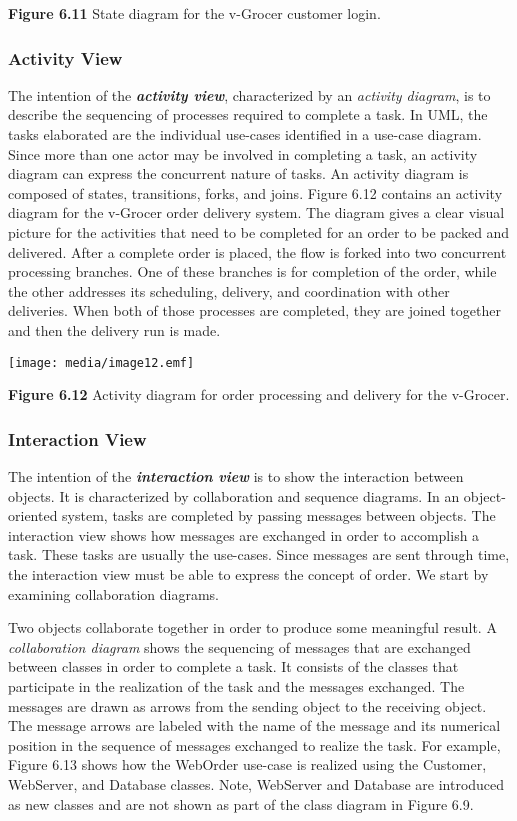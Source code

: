 \textbf{Figure 6.11} State diagram for the v-Grocer customer login.

\subsubsection{Activity View}\label{activity-view}

The intention of the \emph{\textbf{activity view}}, characterized by an
\emph{activity diagram}, is to describe the sequencing of processes
required to complete a task. In UML, the tasks elaborated are the
individual use-cases identified in a use-case diagram. Since more than
one actor may be involved in completing a task, an activity diagram can
express the concurrent nature of tasks. An activity diagram is composed
of states, transitions, forks, and joins. Figure 6.12 contains an
activity diagram for the v-Grocer order delivery system. The diagram
gives a clear visual picture for the activities that need to be
completed for an order to be packed and delivered. After a complete
order is placed, the flow is forked into two concurrent processing
branches. One of these branches is for completion of the order, while
the other addresses its scheduling, delivery, and coordination with
other deliveries. When both of those processes are completed, they are
joined together and then the delivery run is made.

\texttt{[image: media/image12.emf]}

\textbf{Figure 6.12} Activity diagram for order processing and delivery
for the v-Grocer.

\subsubsection{Interaction View}\label{interaction-view}

The intention of the \emph{\textbf{interaction view}} is to show the
interaction between objects. It is characterized by collaboration and
sequence diagrams. In an object-oriented system, tasks are completed by
passing messages between objects. The interaction view shows how
messages are exchanged in order to accomplish a task. These tasks are
usually the use-cases. Since messages are sent through time, the
interaction view must be able to express the concept of order. We start
by examining collaboration diagrams.

Two objects collaborate together in order to produce some meaningful
result. A \emph{collaboration diagram} shows the sequencing of messages
that are exchanged between classes in order to complete a task. It
consists of the classes that participate in the realization of the task
and the messages exchanged. The messages are drawn as arrows from the
sending object to the receiving object. The message arrows are labeled
with the name of the message and its numerical position in the sequence
of messages exchanged to realize the task. For example, Figure 6.13
shows how the WebOrder use-case is realized using the Customer,
WebServer, and Database classes. Note, WebServer and Database are
introduced as new classes and are not shown as part of the class diagram
in Figure 6.9.

